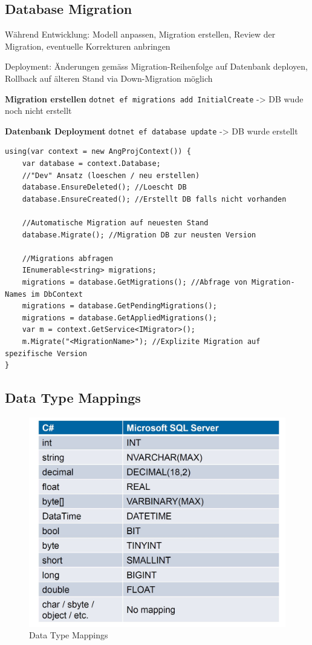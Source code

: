 \documentclass[
a4paper,
oneside,
10pt,
fleqn,
headsepline,
toc=listofnumbered, 
bibliography=totocnumbered]{scrartcl}
\begin{document}
\subsection{Database Migration}
Während Entwicklung:
Modell anpassen, Migration erstellen, Review der Migration, eventuelle Korrekturen anbringen

Deployment:
Änderungen gemäss Migration-Reihenfolge auf Datenbank deployen, Rollback auf älteren Stand via Down-Migration möglich

\textbf{Migration erstellen}
\lstinline{dotnet ef migrations add InitialCreate}
-> DB wude noch nicht erstellt

\textbf{Datenbank Deployment}
\lstinline{dotnet ef database update}
-> DB wurde erstellt

\begin{lstlisting}
using(var context = new AngProjContext()) {
    var database = context.Database;
    //"Dev" Ansatz (loeschen / neu erstellen)
    database.EnsureDeleted(); //Loescht DB
    database.EnsureCreated(); //Erstellt DB falls nicht vorhanden
    
    //Automatische Migration auf neuesten Stand
    database.Migrate(); //Migration DB zur neusten Version
    
    //Migrations abfragen
    IEnumerable<string> migrations;
    migrations = database.GetMigrations(); //Abfrage von Migration-Names im DbContext
    migrations = database.GetPendingMigrations();
    migrations = database.GetAppliedMigrations();
    var m = context.GetService<IMigrator>(); 
    m.Migrate("<MigrationName>"); //Explizite Migration auf spezifische Version
}
\end{lstlisting}

\clearpage

\subsection{Data Type Mappings}
\begin{figure}[h]
	\centering
	\includegraphics[width=0.7\linewidth]{images/datatypemappings}
	\caption{Data Type Mappings}
	\label{fig:datatypemappings}
\end{figure}
\end{document}
